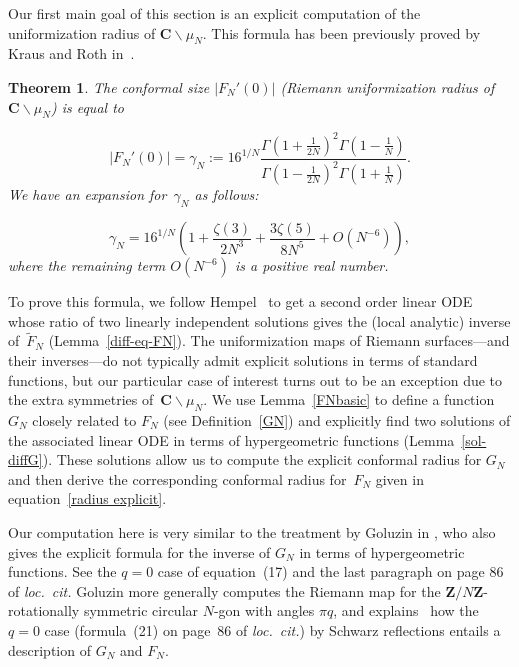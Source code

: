 \documentclass[10pt]{amsart}
\def\SSS{\S}
\renewcommand\setminus{\smallsetminus}
\def\wF{\widetilde{F}}
\def\Z{\mathbf{Z}}
\newtheorem{theorem}[subsubsection]{Theorem}
\theoremstyle{remark}
\numberwithin{equation}{subsection}
\def\numequation{\addtocounter{subsubsection}{1}\begin{equation}}
\def\C{\mathbf{C}}
\begin{document}
Our first main goal of this section is an explicit computation of the uniformization radius of $\C \setminus \mu_N$. This formula has been previously proved by Kraus and Roth in~\cite[Remark~5.1]{KrausRoth}. 

\begin{theorem} \label{exactconformal} The conformal size $|F_N'(0)|$ (Riemann uniformization radius of $\C \setminus \mu_N$) %
is equal to
\numequation   \label{radius explicit}
|F_N'(0)| =  \gamma_N := 16^{1/N}\frac{
\displaystyle{
 \Gamma \left( 1+\frac{1}{2N} \right)^2  \Gamma \left(1 - \frac{1}{N} \right)
}
}{
\displaystyle{
 \Gamma \left( 1-\frac{1}{2N} \right)^2  \Gamma \left(1 + \frac{1}{N} \right)
}}.
\end{equation}
We have an expansion for~$\gamma_N$ as follows:
\numequation\label{explicit-gammaN}
\gamma_N = 16^{1/N} \left(1 + \frac{\zeta(3)}{2 N^3} + \frac{3 \zeta(5)}{8 N^5} + O(N^{-6}) \right),
\end{equation}
where the remaining term $O(N^{-6})$ is a positive real number.
\end{theorem}

To prove this formula, we follow Hempel~\cite{Hempel} to get a second order linear ODE whose ratio of two linearly independent solutions gives the (local analytic) inverse of~$\wF_N$  (Lemma~\ref{diff-eq-FN}). 
The uniformization maps of Riemann surfaces---and their inverses---do not typically admit explicit solutions in terms of standard functions, but
our particular case of interest turns out to be an exception due to the extra symmetries of~$\C \setminus \mu_N$. 
We use Lemma~\ref{FNbasic} to define a function $G_N$ closely related to $F_N$ (see Definition~\ref{GN}) and explicitly find two solutions of the associated linear ODE in terms of hypergeometric functions (Lemma~\ref{sol-diffG}). These solutions allow us to compute the explicit conformal radius for $G_N$ and then derive
the corresponding conformal radius for~$F_N$ given in equation~\eqref{radius explicit}.

Our computation here is very similar to the treatment by Goluzin in \cite[\SSS~III.1]{Goluzin}, who also gives the explicit formula for the inverse of $G_N$ in terms of hypergeometric functions. See the $q = 0$ case of equation~(17) and the last paragraph on page 86 of \emph{loc.~cit.}  Goluzin more generally computes the Riemann map for the $\Z/N\Z$-rotationally symmetric circular $N$-gon with angles $\pi q$, and explains~\cite[\SSS~II.6]{Goluzin} how the $q = 0$ case (formula~(21) on page~86 of \emph{loc.~cit.}) by Schwarz reflections entails a description of $G_N$ and $F_N$.   %
\end{document}

